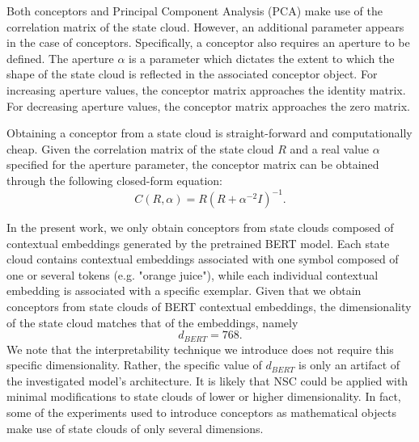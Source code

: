 Both conceptors and Principal Component Analysis (PCA) make use of the correlation matrix of the state cloud. However, an additional parameter appears in the case of conceptors. Specifically, a conceptor also requires an aperture to be defined. The aperture $\alpha$ is a parameter which dictates the extent to which the shape of the state cloud is reflected in the associated conceptor object. For increasing aperture values, the conceptor matrix approaches the identity matrix. For decreasing aperture values, the conceptor matrix approaches the zero matrix.

Obtaining a conceptor from a state cloud is straight-forward and computationally cheap. Given the correlation matrix of the state cloud $R$ and a real value $\alpha$ specified for the aperture parameter, the conceptor matrix can be obtained through the following closed-form equation:$$C(R, \alpha) = R (R + \alpha^{-2} I)^{-1}.$$

In the present work, we only obtain conceptors from state clouds composed of contextual embeddings generated by the pretrained BERT model. Each state cloud contains contextual embeddings associated with one symbol composed of one or several tokens (e.g. "orange juice"), while each individual contextual embedding is associated with a specific exemplar. Given that we obtain conceptors from state clouds of BERT contextual embeddings, the dimensionality of the state cloud matches that of the embeddings, namely $$d_{BERT}=768.$$ We note that the interpretability technique we introduce does not require this specific dimensionality. Rather, the specific value of $d_{BERT}$ is only an artifact of the investigated model's architecture. It is likely that NSC could be applied with minimal modifications to state clouds of lower or higher dimensionality. In fact, some of the experiments used to introduce conceptors as mathematical objects make use of state clouds of only several dimensions.

